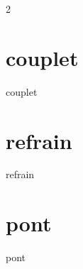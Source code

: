 \newpage

\xxxstruct

\newpage

\begin{multicols}{2}
	\xxxlyrics

\end{multicols}


\newpage
\section*{couplet}
{couplet}
\section*{refrain}
{refrain}
\section*{pont}
{pont}
